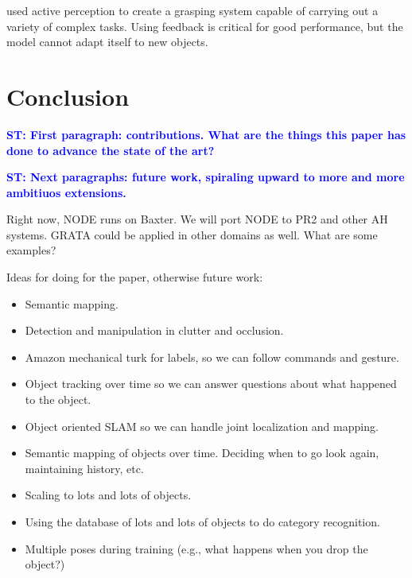\documentclass[conference]{IEEEtran}
\newcommand{\stnote}[1]{\textcolor{blue}{\textbf{ST: #1}}}
\begin{document}
\citet{hudson12} used active perception to create a grasping system
capable of carrying out a variety of complex tasks.  Using feedback is
critical for good performance, but the model cannot adapt itself to
new objects.



\section{Conclusion}

\stnote{First paragraph:  contributions.  What are the things this paper has done to advance the state of the art?}

\stnote{Next paragraphs: future work, spiraling upward to more and
  more ambitiuos extensions.}

Right now, NODE runs on Baxter. We will port NODE to PR2 and other AH systems.
GRATA could be applied in other domains as well.  What are some examples?

Ideas for doing for the paper, otherwise future work: 
\begin{itemize}
\item Semantic mapping. 
\item Detection and manipulation in clutter and occlusion.
\item Amazon mechanical turk for labels, so we can follow commands and gesture.
\item Object tracking over time so we can answer questions about what
  happened to the object.
\item Object oriented SLAM so we can handle joint localization and mapping.
\item Semantic mapping of objects over time.  Deciding when to go look
  again, maintaining history, etc. 
\item Scaling to lots and lots of objects.
\item Using the database of lots and lots of objects to do category recognition.
\item Multiple poses during training (e.g., what happens when you drop
  the object?)
\end{itemize}

%



\end{document}
